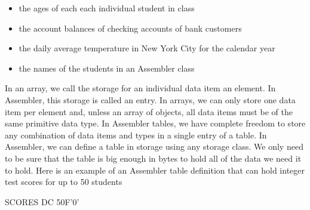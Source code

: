 \documentclass{report}
\begin{document}
\begin{itemize}
            \begin{itemize}
                \item the ages of each each individual student in class
                \item the account balances of checking accounts of bank customers
                \item the daily average temperature in New York City for the calendar year
                \item the names of the students in an Assembler class
            \end{itemize}
            \bigbreak \noindent 
            In an array, we call the storage for an individual data item an element. In Assembler, this storage is called an entry. In arrays, we can only store one data item per element and, unless an array of objects, all data items must be of the same primitive data type. In Assembler tables, we have complete freedom to store any combination of data items and types in a single entry of a table.
            \bigbreak \noindent 
            In Assembler, we can define a table in storage using any storage class. We only need to be sure that the table is big enough in bytes to hold all of the data we need it to hold.
            \bigbreak \noindent 
            Here is an example of an Assembler table definition that can hold integer test scores for up to 50 students
            \bigbreak \noindent 
            \begin{cppcode}
            SCORES DC 50F'0'
            \end{cppcode}
    \end{itemize}



    \bigbreak \noindent 
\end{document}
